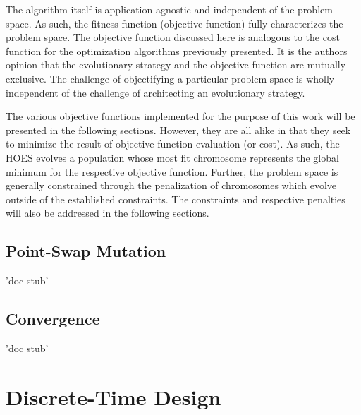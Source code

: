 The algorithm itself is application agnostic and independent of the problem space.
As such, the fitness function (objective function) fully characterizes the problem
space. The objective function discussed here is analogous to the cost function for the
optimization algorithms previously presented. It is the authors opinion that the
evolutionary strategy and the objective function are mutually exclusive. The challenge of
objectifying a particular problem space is wholly independent of the challenge of
architecting an evolutionary strategy.

The various objective functions implemented for the purpose of this work will be
presented in the following sections. However, they are all alike in that they seek to
minimize the result of objective function evaluation (or cost). As such, the HOES evolves
a population whose most fit chromosome represents the global minimum for the respective
objective function. Further, the problem space is generally constrained through the
penalization of chromosomes which evolve outside of the established constraints. The
constraints and respective penalties will also be addressed in the following sections.







\subsection{Point-Swap Mutation}
'doc stub'

\subsection{Convergence}
'doc stub'

\section{Discrete-Time \DSM Design}

